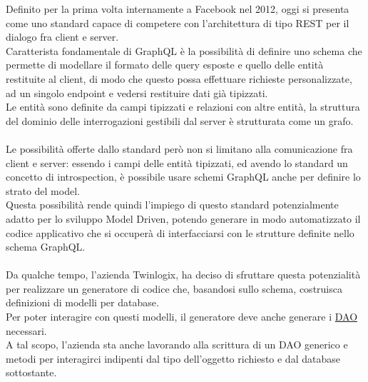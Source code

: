 \documentclass[a4paper, 12pt]{report}
\begin{document}
  Definito per la prima volta internamente a Facebook nel 2012, oggi si presenta come uno standard capace di competere con l'architettura di tipo REST per il dialogo fra client e server. \\
  Caratterista fondamentale di GraphQL è la possibilità di definire uno schema che permette di modellare il formato delle query esposte e quello delle entità restituite al client, di modo che questo possa effettuare richieste personalizzate, ad un singolo endpoint e vedersi restituire dati già tipizzati. \\
    Le entità sono definite da campi tipizzati e relazioni con altre entità, la struttura del dominio delle interrogazioni gestibili dal server è strutturata come un grafo.

    \paragraph*{}Le possibilità offerte dallo standard però non si limitano alla comunicazione fra client e server: essendo i campi delle entità tipizzati, ed avendo lo standard un concetto di introspection, è possibile usare 
    schemi GraphQL anche per definire lo strato del model. \\
    Questa possibilità rende quindi l'impiego di questo standard potenzialmente adatto per lo sviluppo Model Driven, potendo generare in modo automatizzato il codice applicativo che si occuperà di interfacciarsi con le strutture definite nello schema GraphQL.
    
    \paragraph*{}Da qualche tempo, l'azienda Twinlogix, ha deciso di sfruttare questa potenzialità per realizzare un generatore di codice che, basandosi sullo schema, costruisca definizioni di modelli per database. \\
    Per poter interagire con questi modelli, il generatore deve anche generare i \href{https://en.wikipedia.org/wiki/Data_access_object}{DAO} necessari.\\
    A tal scopo, l'azienda sta anche lavorando alla scrittura di un DAO generico e metodi per interagirci indipenti dal tipo dell'oggetto richiesto e dal database sottostante.
    
\end{document}
